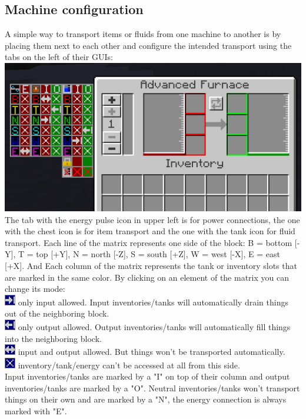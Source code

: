 \documentclass[11pt]{article} %
\begin{document}
\subsection{Machine configuration}
A simple way to transport items or fluids from one machine to another is by placing them next to each other and configure the intended transport using the tabs on the left of their GUIs:\\
\includegraphics[width = \textwidth]{machineCfg}
The tab with the energy pulse icon in upper left is for power connections, the one with the chest icon is for item transport and the one with the tank icon for fluid transport. Each line of the matrix represents one side of the block: B = bottom [-Y], T = top [+Y], N = north [-Z], S = south [+Z], W = west [-X], E = east [+X]. And Each column of the matrix represents the tank or inventory slots that are marked in the same color. By clicking on an element of the matrix you   can change its mode: \\
\includegraphics[]{cfgIn} only input allowed. Input inventories/tanks will automatically drain things out of the neighboring block. \\
\includegraphics[]{cfgOut} only output allowed. Output inventories/tanks will automatically fill things into the neighboring block. \\
\includegraphics[]{cfgBi} input and output allowed. But things won't be transported automatically. \\
\includegraphics[]{cfgNo} inventory/tank/energy can't be accessed at all from this side.\\
Input inventories/tanks are marked by a "I" on top of their column and output inventories/tanks are marked by a "O". Neutral inventories/tanks won't transport things on their own and are marked by a "N", the energy connection is always marked with "E".
\end{document}
